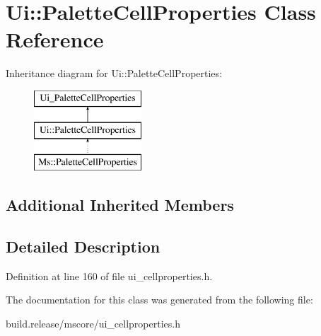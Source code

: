 \hypertarget{class_ui_1_1_palette_cell_properties}{}\section{Ui\+:\+:Palette\+Cell\+Properties Class Reference}
\label{class_ui_1_1_palette_cell_properties}
Inheritance diagram for Ui\+:\+:Palette\+Cell\+Properties\+:\begin{figure}[H]
\begin{center}
\leavevmode
\includegraphics[height=3.000000cm]{class_ui_1_1_palette_cell_properties}
\end{center}
\end{figure}
\subsection*{Additional Inherited Members}


\subsection{Detailed Description}


Definition at line 160 of file ui\+\_\+cellproperties.\+h.



The documentation for this class was generated from the following file\+:\begin{DoxyCompactItemize}
\item 
build.\+release/mscore/ui\+\_\+cellproperties.\+h\end{DoxyCompactItemize}

